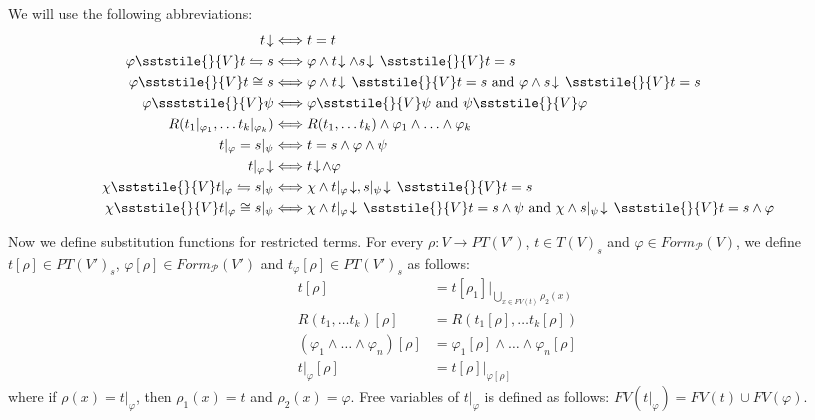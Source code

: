 We will use the following abbreviations:
\begin{align*}
t\!\downarrow & \Longleftrightarrow t = t \\
\varphi \sststile{}{V} t \leftrightharpoons s & \Longleftrightarrow \varphi \land t\!\downarrow \land s\!\downarrow\,\sststile{}{V} t = s \\
\varphi \sststile{}{V} t \cong s & \Longleftrightarrow \varphi \land t\!\downarrow\,\sststile{}{V} t = s \text{ and } \varphi \land s\!\downarrow\,\sststile{}{V} t = s \\
\varphi \ssststile{}{V} \psi & \Longleftrightarrow \varphi \sststile{}{V} \psi \text{ and } \psi \sststile{}{V} \varphi \\
R(t_1|_{\varphi_1}, \ldots t_k|_{\varphi_k}) & \Longleftrightarrow R(t_1, \ldots t_k) \land \varphi_1 \land \ldots \land \varphi_k \\
t|_\varphi = s|_\psi & \Longleftrightarrow t = s \land \varphi \land \psi \\
t|_\varphi\!\downarrow & \Longleftrightarrow t\!\downarrow\!\land \varphi \\
\chi \sststile{}{V} t|_\varphi \leftrightharpoons s|_\psi & \Longleftrightarrow \chi \land t|_\varphi\!\downarrow, s|_\psi\!\downarrow\,\sststile{}{V} t = s \\
\chi \sststile{}{V} t|_\varphi \cong s|_\psi & \Longleftrightarrow \chi \land t|_\varphi\!\downarrow\,\sststile{}{V} t = s \land \psi \text{ and } \chi \land s|_\psi\!\downarrow\,\sststile{}{V} t = s \land \varphi
\end{align*}

Now we define substitution functions for restricted terms.
For every $\rho : V \to PT(V')$, $t \in T(V)_s$ and $\varphi \in Form_\mathcal{P}(V)$,
we define $t[\rho] \in PT(V')_s$, $\varphi[\rho] \in Form_\mathcal{P}(V')$ and $t_\varphi[\rho] \in PT(V')_s$ as follows:
\begin{align*}
t[\rho] & = t[\rho_1]|_{\bigcup_{x \in FV(t)} \rho_2(x)} \\
R(t_1, \ldots t_k)[\rho] & = R(t_1[\rho], \ldots t_k[\rho]) \\
(\varphi_1 \land \ldots \land \varphi_n)[\rho] & = \varphi_1[\rho] \land \ldots \land \varphi_n[\rho] \\
t|_\varphi[\rho] & = t[\rho]|_{\varphi[\rho]}
\end{align*}
where if $\rho(x) = t|_\varphi$, then $\rho_1(x) = t$ and $\rho_2(x) = \varphi$.
Free variables of $t|_\varphi$ is defined as follows: $FV(t|_\varphi) = FV(t) \cup FV(\varphi)$.

